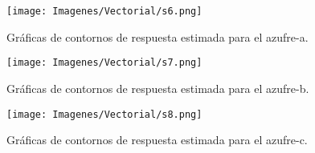\begin{figure}[H]
 \centering
 \texttt{[image: Imagenes/Vectorial/s6.png]}
 \caption{Gr\'aficas de contornos de respuesta estimada para el azufre-a.}
 \label{fig:s6}
\end{figure}

\begin{figure}[H]
 \centering
 \texttt{[image: Imagenes/Vectorial/s7.png]}
 \caption{Gr\'aficas de contornos de respuesta estimada para el azufre-b.}
 \label{fig:s7}
\end{figure}

\begin{figure}[H]
 \centering
 \texttt{[image: Imagenes/Vectorial/s8.png]}
 \caption{Gr\'aficas de contornos de respuesta estimada para el azufre-c.}
 \label{fig:s8}
\end{figure}


